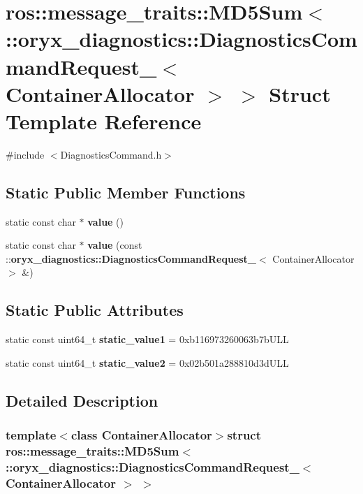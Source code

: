 \section{ros\-:\-:message\-\_\-traits\-:\-:\-M\-D5\-Sum$<$ \-:\-:oryx\-\_\-diagnostics\-:\-:\-Diagnostics\-Command\-Request\-\_\-$<$ \-Container\-Allocator $>$ $>$ \-Struct \-Template \-Reference}
\label{structros_1_1message__traits_1_1MD5Sum_3_01_1_1oryx__diagnostics_1_1DiagnosticsCommandRequest___00856bcfa6e99e9b67a36df7f96be842}


{\ttfamily \#include $<$\-Diagnostics\-Command.\-h$>$}

\subsection*{\-Static \-Public \-Member \-Functions}
\begin{DoxyCompactItemize}
\item 
static const char $\ast$ {\bf value} ()
\item 
static const char $\ast$ {\bf value} (const \-::{\bf oryx\-\_\-diagnostics\-::\-Diagnostics\-Command\-Request\-\_\-}$<$ \-Container\-Allocator $>$ \&)
\end{DoxyCompactItemize}
\subsection*{\-Static \-Public \-Attributes}
\begin{DoxyCompactItemize}
\item 
static const uint64\-\_\-t {\bf static\-\_\-value1} = 0xb116973260063b7b\-U\-L\-L
\item 
static const uint64\-\_\-t {\bf static\-\_\-value2} = 0x02b501a288810d3d\-U\-L\-L
\end{DoxyCompactItemize}


\subsection{\-Detailed \-Description}
\subsubsection*{template$<$class Container\-Allocator$>$struct ros\-::message\-\_\-traits\-::\-M\-D5\-Sum$<$ \-::oryx\-\_\-diagnostics\-::\-Diagnostics\-Command\-Request\-\_\-$<$ Container\-Allocator $>$ $>$}



